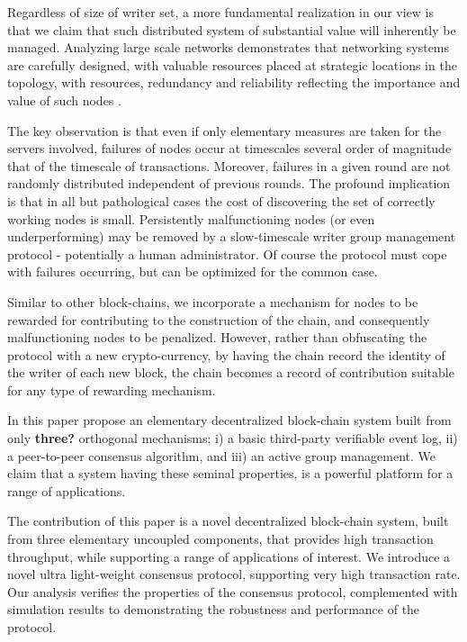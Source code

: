 \documentclass[10pt]{article}
\begin{document}
Regardless of size of writer set, a more fundamental realization in our view is that we claim that such distributed system of substantial value will inherently be managed. Analyzing large scale networks demonstrates that networking systems are carefully designed, with valuable resources placed at strategic locations in the topology, with resources, redundancy and reliability reflecting the importance and value of such nodes \cite{Maltz2004}. 

The key observation is that even if only elementary measures are taken for the servers involved, failures of nodes occur at timescales several order of magnitude that of the timescale of transactions. Moreover, failures in a given round are not randomly distributed independent of previous rounds. The profound implication is that in all but pathological cases the cost of discovering the set of correctly working nodes is small. Persistently malfunctioning nodes (or even underperforming) may be removed by a slow-timescale writer group management protocol - potentially a human administrator. Of course the protocol must cope with failures occurring, but can be optimized for the common case.

Similar to other block-chains, we incorporate a mechanism for nodes to be rewarded for contributing to the construction of the chain, and consequently malfunctioning nodes to be penalized. However, rather than obfuscating the protocol with a new crypto-currency, by having the chain record the identity of the writer of each new block, the chain becomes a record of contribution suitable for any type of rewarding mechanism.

In this paper propose an elementary decentralized block-chain system built from only \textbf{three?} orthogonal mechanisms; i) a basic third-party verifiable event log, ii) a peer-to-peer consensus algorithm, and iii) %
an active group management. 
We claim that a system having these seminal properties, is a powerful platform for a range of applications.

The contribution of this paper is a novel decentralized block-chain system, built from three elementary uncoupled components, that provides high transaction throughput, while supporting a range of applications of interest. We introduce a novel ultra light-weight consensus protocol, supporting very high transaction rate. Our analysis verifies the properties of the consensus protocol, complemented with simulation results to demonstrating the robustness and performance of the protocol. 
\end{document}
